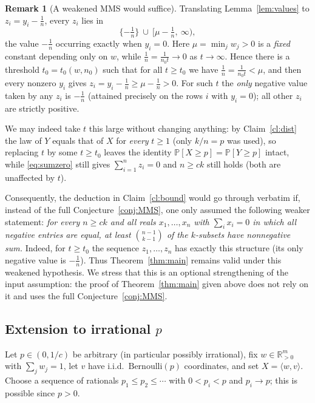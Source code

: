 \documentclass[11pt]{amsart}
\theoremstyle{plain}
\theoremstyle{definition}
\newtheorem{remark}[theorem]{Remark}
\def\bR{\mathbb{R}}
\def\Pb{\mathbb{P}}
\begin{document}
\begin{remark}[A weakened MMS would suffice]\label{rem:weakMMS}
Translating Lemma~\ref{lem:values} to $z_i=y_i-\tfrac1n$, every $z_i$ lies in
\[
\{-\tfrac1n\}\ \cup\ [\mu-\tfrac1n,\ \infty),
\]
the value $-\tfrac1n$ occurring exactly when $y_i=0$. Here $\mu=\min_j w_j>0$ is a
\emph{fixed} constant depending only on $w$, while $\tfrac1n=\tfrac1{n_0 t}\to0$ as
$t\to\infty$. Hence there is a threshold $t_0=t_0(w,n_0)$ such that for all
$t\ge t_0$ we have $\tfrac1n=\tfrac1{n_0t}<\mu$, and then every nonzero $y_i$ gives
$z_i=y_i-\tfrac1n\ge\mu-\tfrac1n>0$. For such $t$ the \emph{only} negative value
taken by any $z_i$ is $-\tfrac1n$ (attained precisely on the rows $i$ with
$y_i=0$); all other $z_i$ are strictly positive.

We may indeed take $t$ this large without changing anything: by
Claim~\ref{cl:dist} the law of $Y$ equals that of $X$ for \emph{every} $t\ge1$
(only $k/n=p$ was used), so replacing $t$ by some $t\ge t_0$ leaves the identity
$\Pb[X\ge p]=\Pb[Y\ge p]$ intact, while \eqref{eq:sumzero} still gives
$\sum_{i=1}^n z_i=0$ and $n\ge ck$ still holds (both are unaffected by $t$).

Consequently, the deduction in Claim~\ref{cl:bound} would go through verbatim if,
instead of the full Conjecture~\ref{conj:MMS}, one only assumed the following
weaker statement: \emph{for every $n\ge ck$ and all reals $x_1,\dots,x_n$ with
$\sum_i x_i=0$ in which all negative entries are equal, at least
$\binom{n-1}{k-1}$ of the $k$-subsets have nonnegative sum.} Indeed, for $t\ge t_0$
the sequence $z_1,\dots,z_n$ has exactly this structure (its only negative value is
$-\tfrac1n$). Thus Theorem~\ref{thm:main} remains valid under this weakened
hypothesis. We stress that this is an optional strengthening of the input
assumption: the proof of Theorem~\ref{thm:main} given above does not rely on it and
uses the full Conjecture~\ref{conj:MMS}.
\end{remark}

\subsection{Extension to irrational $p$}

Let $p\in(0,1/c)$ be arbitrary (in particular possibly irrational), fix
$w\in\bR_{>0}^m$ with $\sum_j w_j=1$, let $v$ have i.i.d.\
$\mathrm{Bernoulli}(p)$ coordinates, and set $X=\langle w,v\rangle$. Choose a
sequence of rationals $p_1\le p_2\le\cdots$ with $0<p_i<p$ and $p_i\to p$; this is
possible since $p>0$.
\end{document}
